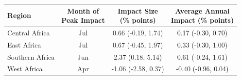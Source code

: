 \begin{table}[!h]
\centering
\begin{tabular}{lccc}
\toprule
Region & \makecell{Month of \\ Peak Impact} & \makecell{Impact Size \\ (\% points)} & \makecell{Average Annual \\ Impact (\% points)}\\
\midrule
Central Africa & Jul & 0.66 (-0.19, 1.74) & 0.17 (-0.30, 0.70)\\
East Africa & Jul & 0.67 (-0.45, 1.97) & 0.33 (-0.30, 1.00)\\
Southern Africa & Jun & 2.37 (0.18, 5.14) & 0.61 (-0.24, 1.61)\\
West Africa & Apr & -1.06 (-2.58, 0.37) & -0.40 (-0.96, 0.04)\\
\bottomrule
\end{tabular}
\end{table}
